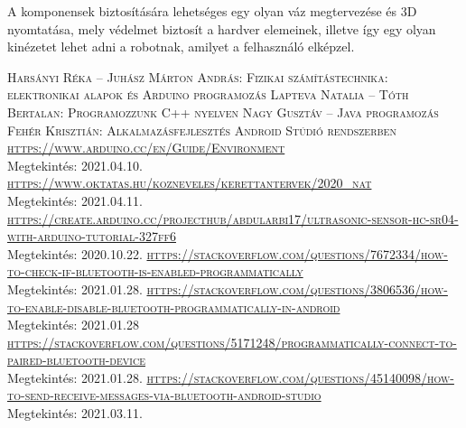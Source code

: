 \documentclass[]{thesis-ekf}
\theoremstyle{definition}
\begin{document}
A komponensek biztosítására lehetséges egy olyan váz megtervezése és 3D nyomtatása, mely védelmet biztosít a hardver elemeinek, illetve így egy olyan kinézetet lehet adni a robotnak, amilyet a felhasználó elképzel.
\begin{thebibliography}{1}
	 \textsc{Harsányi Réka -- Juhász Márton András: Fizikai számítástechnika: elektronikai alapok és Arduino programozás}
	 \textsc{Lapteva Natalia -- Tóth Bertalan: Programozzunk C++ nyelven}
	 \textsc{Nagy Gusztáv -- Java programozás}
		\textsc{Fehér Krisztián: Alkalmazásfejlesztés Android Stúdió rendszerben}
	 \textsc{\url{https://www.arduino.cc/en/Guide/Environment}}\\Megtekintés: 2021.04.10.
	 \textsc{\url{https://www.oktatas.hu/kozneveles/kerettantervek/2020\_nat}}\\Megtekintés: 2021.04.11.
	\textsc{\url{https://create.arduino.cc/projecthub/abdularbi17/ultrasonic-sensor-hc-sr04-with-arduino-tutorial-327ff6}}\\Megtekintés: 2020.10.22.
	\textsc{\url{https://stackoverflow.com/questions/7672334/how-to-check-if-bluetooth-is-enabled-programmatically}}\\Megtekintés: 2021.01.28.
	\textsc{\url{https://stackoverflow.com/questions/3806536/how-to-enable-disable-bluetooth-programmatically-in-android}}\\Megtekintés: 2021.01.28
	\textsc{\url{https://stackoverflow.com/questions/5171248/programmatically-connect-to-paired-bluetooth-device}}\\Megtekintés: 2021.01.28.
	\textsc{\url{https://stackoverflow.com/questions/45140098/how-to-send-receive-messages-via-bluetooth-android-studio}}\\Megtekintés: 2021.03.11.
\end{thebibliography}

\end{document}
